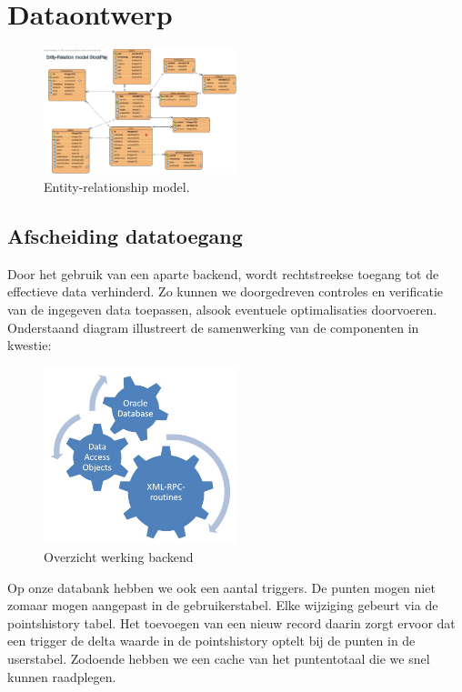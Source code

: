 %
%

\chapter{Dataontwerp}

\begin{figure}[h!]
	\centering
		\includegraphics[width=0.5\textwidth]{images/realisatie/ER_Diagram}
	\caption{Entity-relationship model.}
\end{figure}

\section{Afscheiding datatoegang}

Door het gebruik van een aparte backend, wordt rechtstreekse toegang tot de effectieve data verhinderd. Zo kunnen we doorgedreven controles en verificatie van de ingegeven data toepassen, alsook eventuele optimalisaties doorvoeren. Onderstaand diagram illustreert de samenwerking van de componenten in kwestie:

\begin{figure}[h!]
	\centering
		\includegraphics[width=0.5\textwidth]{images/realisatie/Class_Diagram}
	\caption{Overzicht werking backend}
\end{figure}

Op onze databank hebben we ook een aantal triggers. De punten mogen niet zomaar mogen aangepast in de gebruikerstabel. Elke wijziging gebeurt via de pointshistory tabel. Het toevoegen van een nieuw record daarin zorgt ervoor dat een trigger de delta waarde in de pointshistory optelt bij de punten in de userstabel. Zodoende hebben we een cache van het puntentotaal die we snel kunnen raadplegen.

